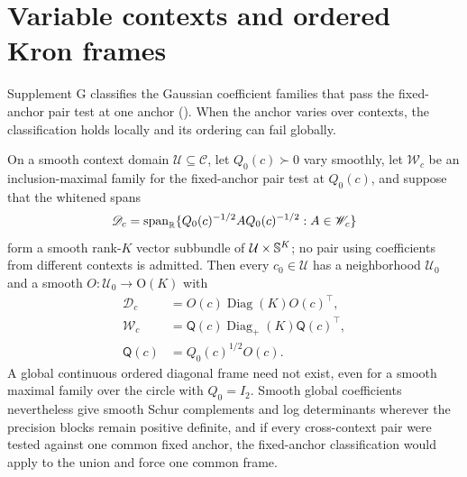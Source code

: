 \section{Variable contexts and ordered Kron frames}
\label{sec:cg-kron-variable-context}

Supplement G classifies the Gaussian coefficient families that pass the fixed-anchor pair test at one
anchor (). When the anchor varies over contexts, the
classification holds locally and its ordering can fail globally.

On a smooth context domain \(\mathcal U\subseteq\mathcal C\), let \(Q_0(c)\succ0\) vary smoothly, let
\(\mathscr W_c\) be an inclusion-maximal family for the fixed-anchor pair test at \(Q_0(c)\), and
suppose that the whitened spans
\begin{equation}
\mathscr D_c
=\operatorname{span}_{\mathbb R}
\{Q_0(c)^{-1/2}AQ_0(c)^{-1/2}:A\in\mathscr W_c\}
\label{eq:cg-kron-context-algebra}
\end{equation}
form a smooth rank-\(K\) vector subbundle of \(\mathcal U\times\mathbb S^K\); no pair using coefficients
from different contexts is admitted. Then every \(c_0\in\mathcal U\) has a neighborhood
\(\mathcal U_0\) and a smooth \(O:\mathcal U_0\to\mathrm O(K)\) with
\begin{equation}
\begin{aligned}
\mathscr D_c&=O(c)\operatorname{Diag}(K)O(c)^\top,\\
\mathscr W_c&=\mathsf Q(c)\operatorname{Diag}_+(K)\mathsf Q(c)^\top,\\
\mathsf Q(c)&=Q_0(c)^{1/2}O(c).
\end{aligned}
\label{eq:cg-kron-local-context-cone}
\end{equation}
A global continuous ordered diagonal frame need not exist, even for a smooth maximal family over the
circle with \(Q_0=I_2\). Smooth global coefficients nevertheless give smooth Schur complements and
log determinants wherever the precision blocks remain positive definite, and if every cross-context
pair were tested against one common fixed anchor, the fixed-anchor classification would apply to the
union and force one common frame. 

